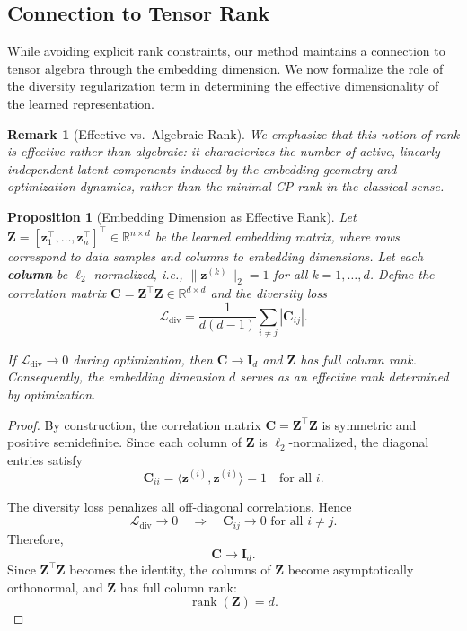 \documentclass[a4paper,12pt,reqno]{amsart}
\newtheorem{proposition}[theorem]{\textbf{Proposition}}
\newtheorem{remark}[theorem]{\textbf{Remark}}
\theoremstyle{definition}
\theoremstyle{remark}
\begin{document}
\subsection{Connection to Tensor Rank}
	While avoiding explicit rank constraints, our method maintains a connection to tensor algebra through the embedding dimension. 
	We now formalize the role of the diversity regularization term in determining the effective dimensionality of the learned representation.
\begin{remark}[Effective vs.\ Algebraic Rank]
	We emphasize that this notion of rank is \emph{effective} rather than algebraic: 
	it characterizes the number of active, linearly independent latent components induced by the embedding geometry and optimization dynamics, 
	rather than the minimal CP rank in the classical sense.
\end{remark}
\begin{proposition}[Embedding Dimension as Effective Rank]\label{prop:embedding_rank}
	Let $\mathbf{Z} = [\mathbf{z}_1^\top, \dots, \mathbf{z}_n^\top]^\top \in \mathbb{R}^{n\times d}$ be the learned embedding matrix, 
	where rows correspond to data samples and columns to embedding dimensions. 
	Let each \textbf{column} be $\ell_2$-normalized, i.e., $\|\mathbf{z}^{(k)}\|_2 = 1$ for all $k=1,\dots,d$. 
	Define the correlation matrix $\mathbf{C} = \mathbf{Z}^\top\mathbf{Z} \in \mathbb{R}^{d\times d}$ and the diversity loss
	\begin{equation}\label{eq:dl}
		\mathcal{L}_{\text{div}} = \frac{1}{d(d-1)} \sum_{i \neq j} |\mathbf{C}_{ij}|.
	\end{equation}
	
	If $\mathcal{L}_{\text{div}} \to 0$ during optimization, then $\mathbf{C} \to \mathbf{I}_d$ and $\mathbf{Z}$ has full column rank.
	Consequently, the embedding dimension $d$ serves as an effective rank determined by optimization.
\end{proposition}
\begin{proof}
	By construction, the correlation matrix $\mathbf{C} = \mathbf{Z}^\top \mathbf{Z}$ is symmetric and positive semidefinite.
	Since each column of $\mathbf{Z}$ is $\ell_2$-normalized, the diagonal entries satisfy
	\[
	\mathbf{C}_{ii} = \langle \mathbf{z}^{(i)}, \mathbf{z}^{(i)} \rangle = 1 \quad \text{for all } i.
	\]
	
	The diversity loss penalizes all off-diagonal correlations. Hence
	\[
	\mathcal{L}_{\text{div}} \to 0 \quad \Rightarrow \quad \mathbf{C}_{ij} \to 0 \text{ for all } i \neq j.
	\]
	Therefore,
	\[
	\mathbf{C} \to \mathbf{I}_d.
	\]
	Since $\mathbf{Z}^\top \mathbf{Z}$ becomes the identity, the columns of $\mathbf{Z}$ become asymptotically orthonormal, and $\mathbf{Z}$ has full column rank:
	\[
	\operatorname{rank}(\mathbf{Z}) = d.
	\]
\end{proof}
\end{document}
